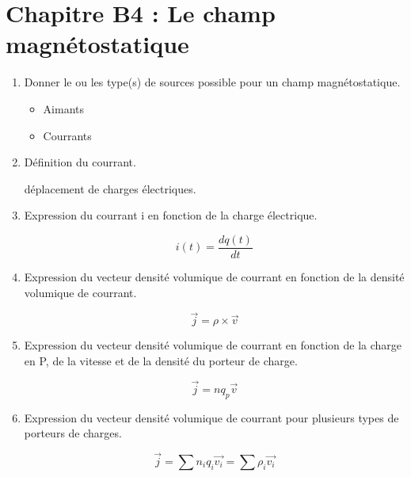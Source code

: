 \section*{\centering Chapitre B4 : Le champ magnétostatique}
\begin{enumerate}[label=\arabic{enumi} - , left=0pt, itemsep=1em] %
   \item Donner le ou les type(s) de sources possible pour un champ magnétostatique. \par
    \begin{solution}
        \begin{itemize}
            \item Aimants
            \item Courrants
        \end{itemize}
    \end{solution}

    \item Définition du courrant.\par
    \begin{solution}
        déplacement de charges électriques.
    \end{solution}

    \item Expression du courrant i en fonction de la charge électrique.\par
    \begin{solution}
        \[ i(t) = \frac{dq(t)}{dt} \]
    \end{solution}


    \item Expression du vecteur densité volumique de courrant en fonction de la densité volumique de courrant.\par
    \begin{solution}
        \[ \vec{j} = \rho \times \vec{v} \]
    \end{solution}

    \item Expression du vecteur densité volumique de courrant en fonction de la charge en P, de la vitesse et de la densité du porteur de charge.\par
    \begin{solution}
         \[ \vec{j} = n q_p \vec{v} \]
    \end{solution}

    \item Expression du vecteur densité volumique de courrant pour plusieurs types de porteurs de charges.\par
    \begin{solution}
         \[ \vec{j} = \sum n_i q_i\vec{v_i} = \sum \rho_i\vec{v_i} \]
    \end{solution}


\end{enumerate}
